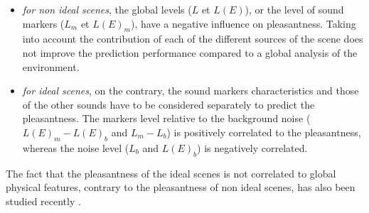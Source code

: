 \documentclass[12pt]{elsarticle}
\newcommand{\cf}{cf.}
\begin{document}
\begin{itemize}
\begin{itemize}
\item \emph{for non ideal scenes}, the global levels ($L$ et $L(E)$), or the level of sound markers ($L_m$ et $L(E)_{m}$), have a negative influence on pleasantness. Taking into account the contribution of each of the different sources of the scene does not improve the prediction performance compared to a global analysis of the environment.


\item \emph{for ideal scenes}, on the contrary, the sound markers characteristics and those of the other sounds have to be considered separately to predict  the pleasantness. The markers level relative to the background noise ($L(E)_m-L(E)_b$ and $L_m-L_b$) is positively correlated to the pleasantness, whereas the noise level ($L_b$ and $L(E)_b$) is negatively correlated.

\end{itemize}
\end{itemize}


The fact that the pleasantness of the ideal scenes is not correlated to global physical features, contrary to the pleasantness of non ideal scenes, has also been studied recently \cite{gozalo2015relationship}.

\end{document}
